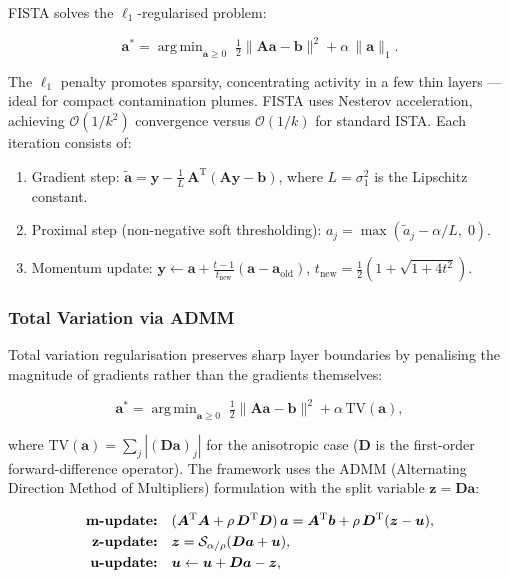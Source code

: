 \documentclass[a4paper,11pt]{article}
\DeclareMathOperator*{\argmin}{arg\,min}
\begin{document}
FISTA \citep{beck2009fast} solves the $\ell_1$-regularised problem:

\begin{equation}\label{eq:fista}
  \bm{a}^* = \argmin_{\bm{a} \geq 0}\; \tfrac{1}{2}\|\bm{A}\bm{a} - \bm{b}\|^2 + \alpha\,\|\bm{a}\|_1.
\end{equation}

The $\ell_1$ penalty promotes sparsity, concentrating activity in a
few thin layers --- ideal for compact contamination plumes.  FISTA uses
Nesterov acceleration, achieving $\mathcal{O}(1/k^2)$ convergence versus
$\mathcal{O}(1/k)$ for standard ISTA.  Each iteration consists of:

\begin{enumerate}
  \item Gradient step: $\tilde{\bm{a}} = \bm{y} - \tfrac{1}{L}\,\bm{A}^\mathrm{T}(\bm{A}\bm{y} - \bm{b})$,
        where $L = \sigma_1^2$ is the Lipschitz constant.
  \item Proximal step (non-negative soft thresholding):
        $a_j = \max(\tilde{a}_j - \alpha/L,\; 0)$.
  \item Momentum update: $\bm{y} \leftarrow \bm{a} + \frac{t-1}{t_{\mathrm{new}}}(\bm{a} - \bm{a}_{\mathrm{old}})$,
        $t_{\mathrm{new}} = \frac{1}{2}(1 + \sqrt{1 + 4t^2})$.
\end{enumerate}

\subsubsection{Total Variation via ADMM}

Total variation regularisation preserves sharp layer boundaries by
penalising the magnitude of gradients rather than the gradients
themselves:

\begin{equation}\label{eq:tv}
  \bm{a}^* = \argmin_{\bm{a} \geq 0}\; \tfrac{1}{2}\|\bm{A}\bm{a} - \bm{b}\|^2 + \alpha\,\mathrm{TV}(\bm{a}),
\end{equation}

where $\mathrm{TV}(\bm{a}) = \sum_j |(\bm{D}\bm{a})_j|$ for the anisotropic
case ($\bm{D}$ is the first-order forward-difference operator).  The
framework uses the ADMM (Alternating Direction Method of Multipliers)
\citep{boyd2011distributed} formulation with the split variable
$\bm{z} = \bm{D}\bm{a}$:

\begin{align}
  \text{\textbf{m-update:}} &\quad
    (\bm{A}^\mathrm{T}\bm{A} + \rho\,\bm{D}^\mathrm{T}\bm{D})\,\bm{a} = \bm{A}^\mathrm{T}\bm{b} + \rho\,\bm{D}^\mathrm{T}(\bm{z} - \bm{u}), \label{eq:admm_m}\\
  \text{\textbf{z-update:}} &\quad
    \bm{z} = \mathcal{S}_{\alpha/\rho}(\bm{D}\bm{a} + \bm{u}), \label{eq:admm_z}\\
  \text{\textbf{u-update:}} &\quad
    \bm{u} \leftarrow \bm{u} + \bm{D}\bm{a} - \bm{z}, \label{eq:admm_u}
\end{align}
\end{document}
